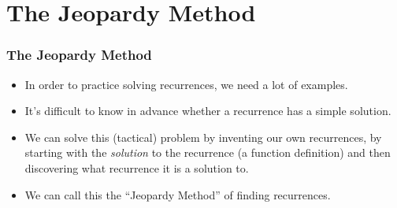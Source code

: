 \documentclass{beamer}
\newcommand{\sect}[1]{
\section{#1}
\begin{frame}[fragile]\frametitle{#1}
}
\newcommand{\bi}{\begin{itemize}}
\newcommand{\ii}{\item}
\newcommand{\ei}{\end{itemize}}
\begin{document}
%


\sect{The Jeopardy Method}

\bi
\ii
In order to practice solving recurrences, we need a lot of
examples.
\ii
It's difficult to know in advance whether a recurrence has
a simple solution.
\ii
We can solve this (tactical) problem by inventing our
own recurrences, by starting with the {\em solution} to
the recurrence (a function definition) and then discovering
what recurrence it is a solution to.
\ii
We can call this the ``Jeopardy Method'' of finding recurrences.
\ei
\end{frame}
\end{document}

